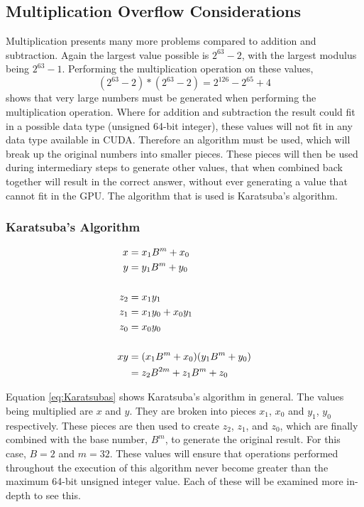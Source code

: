 \subsection{Multiplication Overflow Considerations}
Multiplication presents many more problems compared to addition and subtraction. Again the largest value possible is $2^{63} - 2$, with the largest modulus being $2^{63} - 1$. Performing the multiplication operation on these values, 
\begin{equation} \label{eq:mul}
(2^{63} - 2) * (2^{63} - 2) = 2^{126} - 2^{65} + 4
\end{equation}
shows that very large numbers must be generated when performing the multiplication operation. Where for addition and subtraction the result could fit in a possible data type (unsigned 64-bit integer), these values will not fit in any data type available in CUDA. Therefore an algorithm must be used, which will break up the original numbers into smaller pieces. These pieces will then be used during intermediary steps to generate other values, that when combined back together will result in the correct answer, without ever generating a value that cannot fit in the GPU. The algorithm that is used is Karatsuba's algorithm. 

\subsubsection{Karatsuba's Algorithm}
\begin{equation} \label{eq:Karatsubas}
\begin{split}
x &= x_1 B^m + x_0\\
y &= y_1 B^m + y_0 \cr\\
z_2 &= x_1 y_1\\
z_1 &= x_1 y_0 + x_0 y_1\\
z_0 &= x_0 y_0 \cr\\
xy & = (x_1 B^m + x_0)(y_1 B^m + y_0)\\
 & = z_2 B^{2m} + z_1 B^{m} + z_0
\end{split}
\end{equation}

Equation \ref{eq:Karatsubas} shows Karatsuba's algorithm in general. The values being multiplied are $x$ and $y$. They are broken into pieces $x_1$, $x_0$ and $y_1$, $y_0$ respectively. These pieces are then used to create $z_2$, $z_1$, and $z_0$, which are finally combined with the base number, $B^m$, to generate the original result. For this case, $B=2$ and $m=32$. These values will ensure that operations performed throughout the execution of this algorithm never become greater than the maximum 64-bit unsigned integer value. Each of these will be examined more in-depth to see this.

